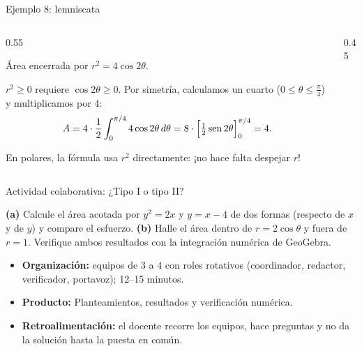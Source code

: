 \documentclass[10pt,aspectratio=169]{beamer}
\begin{document}
\begin{frame}{Ejemplo 8: lemniscata}
  \begin{columns}
    \begin{column}{0.55\textwidth}
      \begin{ejemplo}
        Área encerrada por $r^2=4\cos2\theta$.

        $r^2\ge0$ requiere $\cos2\theta\ge0$. Por simetría, calculamos un cuarto ($0\le\theta\le\frac\pi4$) y multiplicamos por 4:
        \[ A=4\cdot\frac12\int_0^{\pi/4}4\cos2\theta\,d\theta=8\cdot\Big[\tfrac12\operatorname{sen}2\theta\Big]_0^{\pi/4}=4. \]
      \end{ejemplo}
      \begin{idea}
        En polares, la fórmula usa $r^2$ directamente: ¡no hace falta despejar $r$!
      \end{idea}
    \end{column}
    \begin{column}{0.45\textwidth}
      \centering
    \end{column}
  \end{columns}
\end{frame}

\begin{frame}{Actividad colaborativa: ¿Tipo I o tipo II?}
  \small
  \begin{activa}
    \textbf{(a)} Calcule el área acotada por $y^2=2x$ y $y=x-4$ de dos formas (respecto de $x$ y de $y$) y compare el esfuerzo. \textbf{(b)} Halle el área dentro de $r=2\cos\theta$ y fuera de $r=1$. Verifique ambos resultados con la integración numérica de GeoGebra.
  \end{activa}
  \begin{itemize}
    \item \textbf{Organización:} equipos de 3 a 4 con roles rotativos (coordinador, redactor, verificador, portavoz); 12--15 minutos.
    \item \textbf{Producto:} Planteamientos, resultados y verificación numérica.
    \item \textbf{Retroalimentación:} el docente recorre los equipos, hace preguntas y no da la solución hasta la puesta en común.
  \end{itemize}
\end{frame}
\end{document}
